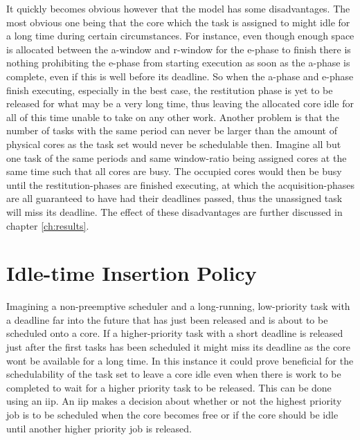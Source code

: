 \documentclass{kththesis}
\begin{document}
It quickly becomes obvious however that the model has some disadvantages. The most obvious one being
that the core which the task is assigned to might idle for a long time during certain circumstances.
For instance, even though enough space is allocated between the \acrshort{a}-window and
\acrshort{r}-window for the \acrshort{e}-phase to finish there is nothing prohibiting the
\acrshort{e}-phase from starting execution as soon as the \acrshort{a}-phase is complete, even if
this is well before its deadline. So when the \acrshort{a}-phase and \acrshort{e}-phase finish
executing, especially in the best case, the restitution phase is yet to be released for what may be
a very long time, thus leaving the allocated core idle for all of this time unable to take on any
other work. Another problem is that the number of tasks with the same period can never be larger
than the amount of physical cores as the task set would never be schedulable then. Imagine all but
one task of the same periods and same window-ratio being assigned cores at the same time such that
all cores are busy. The occupied cores would then be busy until the restitution-phases are finished
executing, at which the acquisition-phases are all guaranteed to have had their deadlines passed,
thus the unassigned task will miss its deadline. The effect of these disadvantages are further
discussed in chapter \ref{ch:results}.


\section{Idle-time Insertion Policy} \label{sec:iip}


Imagining a non-preemptive scheduler and a long-running, low-priority task with a deadline far into
the future that has just been released and is about to be scheduled onto a core. If a
higher-priority task with a short deadline is released just after the first tasks has been scheduled
it might miss its deadline as the core wont be available for a long time. In this instance it could
prove beneficial for the schedulability of the task set to leave a core idle even when there is work
to be completed to wait for a higher priority task to be released. This can be done using an
\acrfull{iip}. An \acrshort{iip} makes a decision about whether or not the highest priority job is
to be scheduled when the core becomes free or if the core should be idle until another higher
priority job is released.
\end{document}

